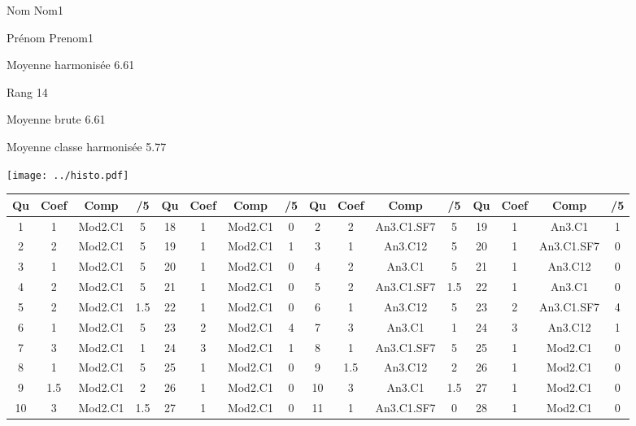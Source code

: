 \begin{minipage}[c]{.45\linewidth} 
Nom Nom1
 
Prénom Prenom1
 
Moyenne harmonisée 6.61
 
Rang 14
 
Moyenne brute 6.61
 
Moyenne classe harmonisée 5.77
 
\end{minipage}\hfill 
\begin{minipage}[c]{.45\linewidth}  
\begin{center}
\texttt{[image: ../histo.pdf]} 
\end{center}
\end{minipage}
\vspace{1cm}
\footnotesize 
\begin{center} 
\begin{tabular}{|c|c|c|c||c|c|c|c||c|c|c|c||c|c|c|c|} 
\hline \textbf{Qu} & \textbf{Coef} & \textbf{Comp} & \textbf{/5} & \textbf{Qu} & \textbf{Coef} & \textbf{Comp} & \textbf{/5} & \textbf{Qu} & \textbf{Coef} & \textbf{Comp} & \textbf{/5} & \textbf{Qu} & \textbf{Coef} & \textbf{Comp} & \textbf{/5} \\ 
\hline 
\hline 
1 & 1 & Mod2.C1 & 5 & 18 & 1 & Mod2.C1 & 0 & 2 & 2 & An3.C1.SF7 & 5 & 19 & 1 & An3.C1 & 1 \\ \hline 
2 & 2 & Mod2.C1 & 5 & 19 & 1 & Mod2.C1 & 1 & 3 & 1 & An3.C12 & 5 & 20 & 1 & An3.C1.SF7 & 0 \\ \hline 
3 & 1 & Mod2.C1 & 5 & 20 & 1 & Mod2.C1 & 0 & 4 & 2 & An3.C1 & 5 & 21 & 1 & An3.C12 & 0 \\ \hline 
4 & 2 & Mod2.C1 & 5 & 21 & 1 & Mod2.C1 & 0 & 5 & 2 & An3.C1.SF7 & 1.5 & 22 & 1 & An3.C1 & 0 \\ \hline 
5 & 2 & Mod2.C1 & 1.5 & 22 & 1 & Mod2.C1 & 0 & 6 & 1 & An3.C12 & 5 & 23 & 2 & An3.C1.SF7 & 4 \\ \hline 
6 & 1 & Mod2.C1 & 5 & 23 & 2 & Mod2.C1 & 4 & 7 & 3 & An3.C1 & 1 & 24 & 3 & An3.C12 & 1 \\ \hline 
7 & 3 & Mod2.C1 & 1 & 24 & 3 & Mod2.C1 & 1 & 8 & 1 & An3.C1.SF7 & 5 & 25 & 1 & Mod2.C1 & 0 \\ \hline 
8 & 1 & Mod2.C1 & 5 & 25 & 1 & Mod2.C1 & 0 & 9 & 1.5 & An3.C12 & 2 & 26 & 1 & Mod2.C1 & 0 \\ \hline 
9 & 1.5 & Mod2.C1 & 2 & 26 & 1 & Mod2.C1 & 0 & 10 & 3 & An3.C1 & 1.5 & 27 & 1 & Mod2.C1 & 0 \\ \hline 
10 & 3 & Mod2.C1 & 1.5 & 27 & 1 & Mod2.C1 & 0 & 11 & 1 & An3.C1.SF7 & 0 & 28 & 1 & Mod2.C1 & 0 \\ \hline 

\end{tabular}
\end{center}
